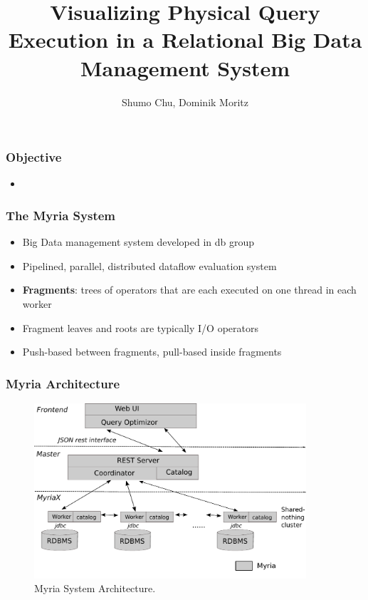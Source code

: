 \documentclass[mathserif,serif,handout]{beamer}
\title[Query Visualization] %
{Visualizing Physical Query Execution in a Relational Big Data Management System}
\subtitle{}
\author[Chu, moritz] %
{Shumo Chu, Dominik Moritz}
\begin{document}
\begin{frame}
\titlepage

\end{frame}

\begin{frame}
\frametitle{Objective}
\begin{itemize}
	\item 
\end{itemize}
\end{frame}

\begin{frame}
\frametitle{The Myria System}
\begin{itemize}
	\item Big Data management system developed in db group
	\item Pipelined, parallel, distributed dataflow evaluation system
	\item \textbf{Fragments}: trees of operators that are each executed on one thread in each worker
	\item Fragment leaves and roots are typically I/O operators
  \item Push\--based between fragments, pull\--based inside fragments
\end{itemize}
\end{frame}

\begin{frame}
\frametitle{Myria Architecture}
\begin{figure}
 \begin{center}
     \includegraphics[width=0.9\textwidth]{myria_arch.pdf}
   \end{center}
  \caption{Myria System Architecture.}
  \label{fig:myria_arc}
\end{figure}
\end{frame}
\end{document}
